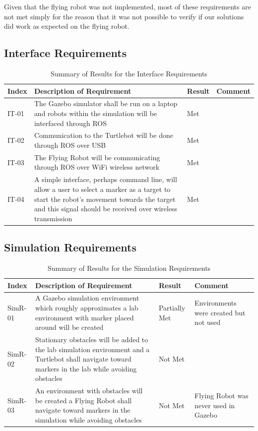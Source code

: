 \documentclass{article}[12]
\begin{document}
Given that the flying robot was not implemented, most of these requirements are not met simply for the reason that it was not possible to verify if our solutions did work as expected on the flying robot.

 \subsection{Interface Requirements}

	\begin{table}[H]
  \small
		\begin{tabular}{p{2cm} p{8cm} p{2cm} p{3cm}}
			\hline
			{\textbf{Index}} & {\textbf{Description of Requirement}} & {\textbf{Result}} & {\textbf{Comment}} \\ \hline
IT-01 & The Gazebo simulator shall be run on a laptop and robots within the simulation will be interfaced through ROS & Met & \\
IT-02 & Communication to the Turtlebot will be done through ROS over USB & Met & \\
IT-03 & The Flying Robot will be communicating through ROS over WiFi wireless network & Met &\\
IT-04 & A simple interface, perhaps command line, will allow a user to select a marker as a target to start the robot's movement towards the target and this signal should be received over wireless transmission & Met & \\ \hline
		\end{tabular}
		\caption{Summary of Results for the Interface Requirements}
		\label{table:interresults}
 \end{table}
 
 \subsection{Simulation Requirements}

	\begin{table}[H]
  \small
		\begin{tabular}{p{2cm} p{8cm} p{2cm} p{3cm}}
			\hline
			{\textbf{Index}} & {\textbf{Description of Requirement}} & {\textbf{Result}} & {\textbf{Comment}} \\ \hline
SimR-01 & A Gazebo simulation environment which roughly approximates a lab environment with marker placed around will be created & Partially Met & Environments were created but not used\\
SimR-02 & Stationary obstacles will be added to the lab simulation environment and a Turtlebot shall navigate toward markers in the lab while avoiding obstacles & Not Met & \\
SimR-03 & An environment with obstacles will be created a Flying Robot shall navigate toward markers in the simulation while avoiding obstacles & Not Met & Flying Robot was never used in Gazebo \\ \hline
		\end{tabular}
		\caption{Summary of Results for the Simulation Requirements}
		\label{table:simresults}
 \end{table}
\end{document}
